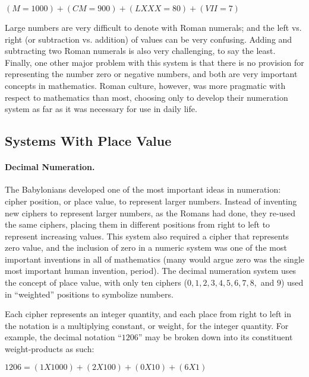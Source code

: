 \begin{center}
  $ (M = 1000) + (CM = 900) + (LXXX = 80) + (VII = 7) $
\end{center}

Large numbers are very difficult to denote with Roman numerals; and the left vs. right (or subtraction vs. addition) of values can be very confusing. Adding and subtracting two Roman numerals is also very challenging, to say the least. Finally, one other major problem with this system is that there is no provision for representing the number zero or negative numbers, and both are very important concepts in mathematics. Roman culture, however, was more pragmatic with respect to mathematics than most, choosing only to develop their numeration system as far as it was necessary for use in daily life.

\subsection{Systems With Place Value}
\label{MF:sub:systems_with_place_value}
\paragraph{Decimal Numeration.} The Babylonians developed one of the most important ideas in numeration: cipher position, or place value, to represent larger numbers. Instead of inventing new ciphers to represent larger numbers, as the Romans had done, they re-used the same ciphers, placing them in different positions from right to left to represent increasing values. This system also required a cipher that represents zero value, and the inclusion of zero in a numeric system was one of the most important inventions in all of mathematics (many would argue zero was the single most important human invention, period). The decimal numeration system uses the concept of place value, with only ten ciphers ($ 0, 1, 2, 3, 4, 5, 6, 7, 8, $ and $ 9 $) used in ``weighted'' positions to symbolize numbers.

Each cipher represents an integer quantity, and each place from right to left in the notation is a multiplying constant, or weight, for the integer quantity. For example, the decimal notation ``$ 1206 $'' may be broken down into its constituent weight-products as such:

\begin{center}
  $ 1206 = (1 X 1000) + (2 X 100) + (0 X 10) + (6 X 1) $
\end{center}

